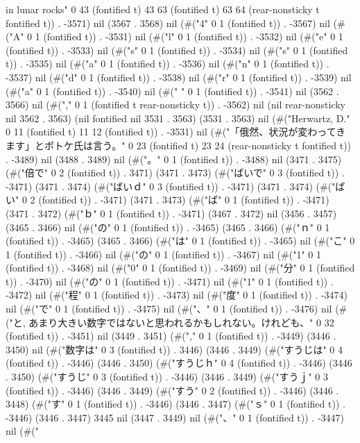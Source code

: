        in lunar rocks" 0 43 (fontified t) 43 63 (fontified t) 63 64 (rear-nonsticky t fontified t)) . -3571) nil (3567 . 3568) nil (#("4" 0 1 (fontified t)) . -3567) nil (#("A" 0 1 (fontified t)) . -3531) nil (#("l" 0 1 (fontified t)) . -3532) nil (#("e" 0 1 (fontified t)) . -3533) nil (#("s" 0 1 (fontified t)) . -3534) nil (#("s" 0 1 (fontified t)) . -3535) nil (#("a" 0 1 (fontified t)) . -3536) nil (#("n" 0 1 (fontified t)) . -3537) nil (#("d" 0 1 (fontified t)) . -3538) nil (#("r" 0 1 (fontified t)) . -3539) nil (#("a" 0 1 (fontified t)) . -3540) nil (#(" " 0 1 (fontified t)) . -3541) nil (3562 . 3566) nil (#("," 0 1 (fontified t rear-nonsticky t)) . -3562) nil (nil rear-nonsticky nil 3562 . 3563) (nil fontified nil 3531 . 3563) (3531 . 3563) nil (#("Herwartz, D." 0 11 (fontified t) 11 12 (fontified t)) . -3531) nil (#("「俄然、状況が変わってきます」とボトケ氏は言う。" 0 23 (fontified t) 23 24 (rear-nonsticky t fontified t)) . -3489) nil (3488 . 3489) nil (#("。" 0 1 (fontified t)) . -3488) nil (3471 . 3475) (#("倍で" 0 2 (fontified t)) . 3471) (3471 . 3473) (#("ばいで" 0 3 (fontified t)) . -3471) (3471 . 3474) (#("ばいｄ" 0 3 (fontified t)) . -3471) (3471 . 3474) (#("ばい" 0 2 (fontified t)) . -3471) (3471 . 3473) (#("ば" 0 1 (fontified t)) . -3471) (3471 . 3472) (#("ｂ" 0 1 (fontified t)) . -3471) (3467 . 3472) nil (3456 . 3457) (3465 . 3466) nil (#("の" 0 1 (fontified t)) . -3465) (3465 . 3466) (#("ｎ" 0 1 (fontified t)) . -3465) (3465 . 3466) (#("は" 0 1 (fontified t)) . -3465) nil (#("こ" 0 1 (fontified t)) . -3466) nil (#("の" 0 1 (fontified t)) . -3467) nil (#("1" 0 1 (fontified t)) . -3468) nil (#("0" 0 1 (fontified t)) . -3469) nil (#("分" 0 1 (fontified t)) . -3470) nil (#("の" 0 1 (fontified t)) . -3471) nil (#("1" 0 1 (fontified t)) . -3472) nil (#("程" 0 1 (fontified t)) . -3473) nil (#("度" 0 1 (fontified t)) . -3474) nil (#("で" 0 1 (fontified t)) . -3475) nil (#("、" 0 1 (fontified t)) . -3476) nil (#("と, あまり大きい数字ではないと思われるかもしれない。けれども、" 0 32 (fontified t)) . -3451) nil (3449 . 3451) (#("," 0 1 (fontified t)) . -3449) (3446 . 3450) nil (#("数字は" 0 3 (fontified t)) . 3446) (3446 . 3449) (#("すうじは" 0 4 (fontified t)) . -3446) (3446 . 3450) (#("すうじｈ" 0 4 (fontified t)) . -3446) (3446 . 3450) (#("すうじ" 0 3 (fontified t)) . -3446) (3446 . 3449) (#("すうｊ" 0 3 (fontified t)) . -3446) (3446 . 3449) (#("すう" 0 2 (fontified t)) . -3446) (3446 . 3448) (#("す" 0 1 (fontified t)) . -3446) (3446 . 3447) (#("ｓ" 0 1 (fontified t)) . -3446) (3446 . 3447) 3445 nil (3447 . 3449) nil (#("、" 0 1 (fontified t)) . -3447) nil (#("
